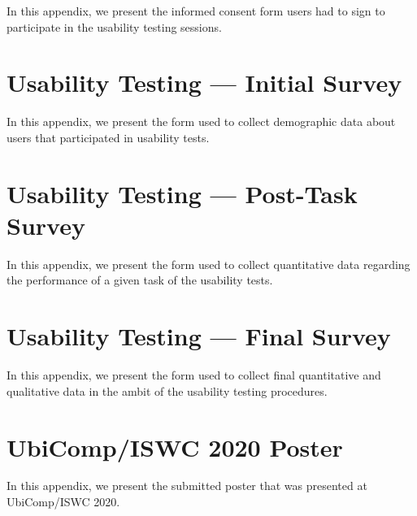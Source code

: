 In this appendix, we present the informed consent form users had to sign to participate in the usability testing sessions.



\chapter{Usability Testing — Initial Survey}
\label{chapter:appendixJ}

In this appendix, we present the form used to collect demographic data about users that participated in usability tests.



\chapter{Usability Testing — Post-Task Survey}
\label{chapter:appendixK}


In this appendix, we present the form used to collect quantitative data regarding the performance of a given task of the usability tests.



\chapter{Usability Testing — Final Survey}
\label{chapter:appendixL}

In this appendix, we present the form used to collect final quantitative and qualitative data in the ambit of the usability testing procedures.



\chapter{UbiComp/ISWC 2020 Poster}
\label{chapter:appendixM}

In this appendix, we present the submitted poster that was presented at UbiComp/ISWC 2020.



